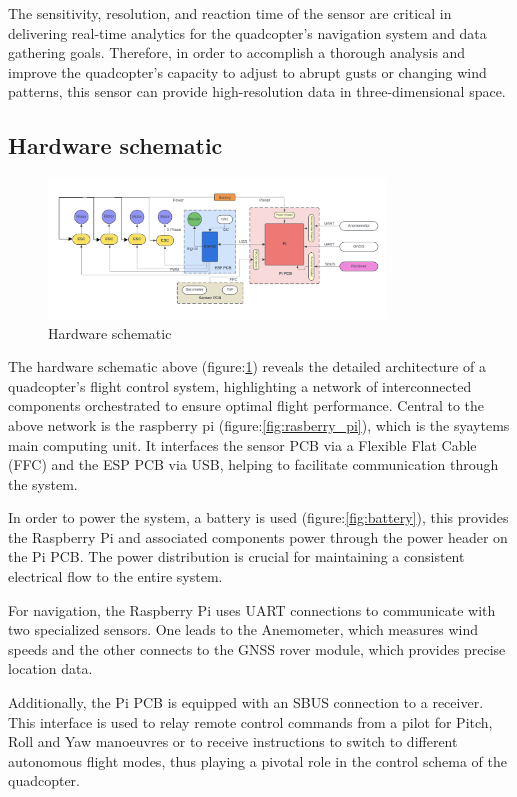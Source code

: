 \documentclass{article}
\begin{document}
The sensitivity, resolution, and reaction time of the sensor are critical in
delivering real-time analytics for the quadcopter's navigation system and data
gathering goals. Therefore, in order to accomplish a thorough analysis and
improve the quadcopter's capacity to adjust to abrupt gusts or changing wind
patterns, this sensor can provide high-resolution data in three-dimensional
space.
\subsection{Hardware schematic}
\begin{figure}[H]
  \centering
  \includegraphics[width=0.8\textwidth]{Pictures/Hardware_schematic.png}
  \caption{Hardware schematic}
  \label{fig:hardware_schematic}
\end{figure}

The hardware schematic above (figure:\ref{fig:hardware_schematic}) reveals the
detailed architecture of a quadcopter's flight control system, highlighting a
network of interconnected components orchestrated to ensure optimal flight
performance. Central to the above network is the raspberry pi
(figure:\ref{fig:rasberry_pi}), which is the syaytems main computing unit. It
interfaces the sensor PCB via a Flexible Flat Cable (FFC) and the ESP PCB via
USB, helping to facilitate communication through the system.

In order to power the system, a battery is used (figure:\ref{fig:battery}), this
provides the Raspberry Pi and associated components power through the power
header on the Pi PCB. The power distribution is crucial for maintaining a
consistent electrical flow to the entire system.

For navigation, the Raspberry Pi uses UART connections to communicate with two
specialized sensors. One leads to the Anemometer, which measures wind speeds and
the other connects to the GNSS rover module, which provides precise location
data.

Additionally, the Pi PCB is equipped with an SBUS connection to a receiver. This
interface is used to relay remote control commands from a pilot for Pitch, Roll
and Yaw manoeuvres or to receive instructions to switch to different autonomous
flight modes, thus playing a pivotal role in the control schema of the
quadcopter.
\end{document}

